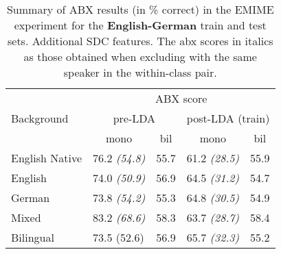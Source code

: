 \begin{table}[h!]
\centering
\begin{tabular}{@{}lclcl@{}}
\toprule
\multirow{3}{*}{Background} & \multicolumn{4}{c}{ABX score} \\
 & \multicolumn{2}{c}{pre-LDA} & \multicolumn{2}{c}{post-LDA (train)} \\
 & mono & \multicolumn{1}{c}{bil} & mono & \multicolumn{1}{c}{bil} \\ \midrule
 English Native & 76.2 \textit{(54.8)} & 55.7  & 61.2\textit{ (28.5)} & 55.9  \\
English  & 74.0 \textit{(50.9) }& 56.9 & 64.5 \textit{(31.2)} & 54.7 \\
German & 73.8\textit{ (54.2)} & 55.3  & 64.8 \textit{(30.5)} & 54.9 \\
Mixed & \multicolumn{1}{l}{83.2 \textit{(68.6)}} & 58.3 & \multicolumn{1}{l}{63.7 \textit{(28.7)}} & 58.4  \\
Bilingual & \multicolumn{1}{l}{73.5 (52.6)} & 56.9  & \multicolumn{1}{l}{65.7 \textit{(32.3)}} & 55.2  \\ \bottomrule
\end{tabular}
\caption{Summary of ABX results (in \% correct) in the EMIME experiment for the \textbf{English-German} train and test sets.  Additional SDC features. The abx scores in italics as those obtained when excluding with the same speaker in the within-class pair. }
\label{Table: xxx}
\end{table}




